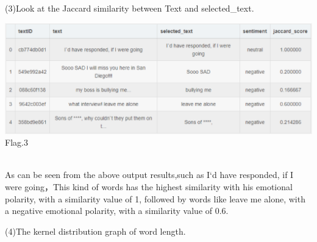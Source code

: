 (3)Look at the Jaccard similarity between Text and selected_text.
\begin{center}
  \begin{minipage}{1\linewidth}
  \centering
  \includegraphics[width=1\textwidth]{kaggle/1.8.eps}
  {\small{Flag.3}}
  \end{minipage}
  \hfill
  \\
  As can be seen from the above output results,such as I`d have responded, if I 
  were going，This kind of words has the highest similarity with his
   emotional polarity, with a similarity value of 1, followed by words 
   like leave me alone, with a negative emotional polarity, with a 
   similarity value of 0.6.
\end{center}
(4)The kernel distribution graph of word length.

